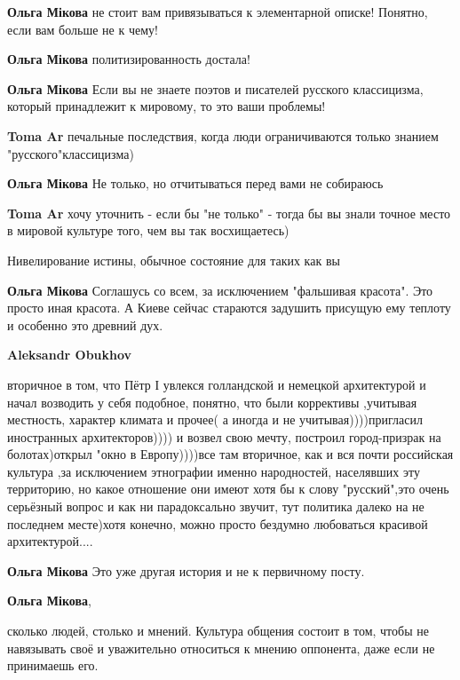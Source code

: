 \begin{itemize}
\begin{itemize}
\begin{itemize}
\textbf{Ольга Мікова} не стоит вам привязываться к элементарной описке! Понятно, если вам больше не к чему!

\textbf{Ольга Мікова} политизированность достала!

\textbf{Ольга Мікова} Если вы не знаете поэтов и писателей русского классицизма, который принадлежит к мировому, то это ваши проблемы!

\textbf{Toma Ar} печальные последствия, когда люди ограничиваются только знанием "русского"классицизма)

\textbf{Ольга Мікова} Не только, но отчитываться перед вами не собираюсь

\textbf{Toma Ar} хочу уточнить - если бы "не только" - тогда бы вы знали точное место в мировой культуре того, чем вы так восхищаетесь)

Нивелирование истины, обычное состояние для таких как вы
\end{itemize} %

\textbf{Ольга Мікова}
Соглашусь со всем, за исключением "фальшивая красота".
Это просто иная красота.
А Киеве сейчас стараются задушить присущую ему теплоту и особенно это древний дух.

\begin{itemize} %
\textbf{Aleksandr Obukhov} 

вторичное в том, что Пётр І увлекся голландской и немецкой архитектурой и начал
возводить у себя подобное, понятно, что были коррективы ,учитывая местность,
характер климата и прочее( а иногда и не учитывая))))пригласил иностранных
архитекторов)))) и возвел свою мечту, построил город-призрак на болотах)открыл
"окно в Европу))))все там вторичное, как и вся почти российская культура ,за
исключением этнографии именно народностей, населявших эту территорию, но какое
отношение они имеют хотя бы к слову "русский",это очень серьёзный вопрос и как
ни парадоксально звучит, тут политика далеко на не последнем месте)хотя конечно,
можно просто бездумно любоваться красивой архитектурой....

\textbf{Ольга Мікова}
Это уже другая история и не к первичному посту.
\end{itemize} %

\textbf{Ольга Мікова}, 

сколько людей, столько и мнений. Культура общения состоит в том, чтобы не
навязывать своё и уважительно относиться к мнению оппонента, даже если не
принимаешь его.


\end{itemize}
\end{itemize}
